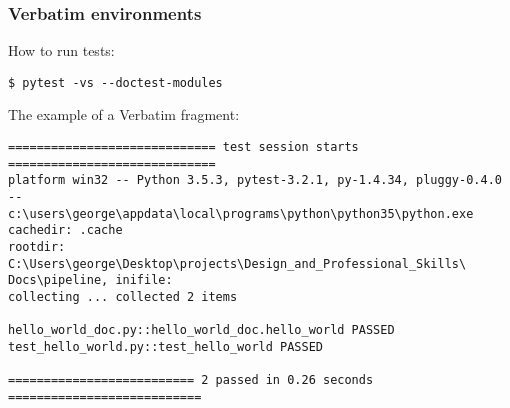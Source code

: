 \documentclass{beamer}
\begin{document}
\date{\today} 




\begin{frame}[fragile]
\frametitle{Verbatim environments} 

How to run tests:
\begin{verbatim}
$ pytest -vs --doctest-modules
\end{verbatim}

\vspace{5mm}

The example of a Verbatim fragment:
\scriptsize %
\begin{verbatim}
============================= test session starts =============================
platform win32 -- Python 3.5.3, pytest-3.2.1, py-1.4.34, pluggy-0.4.0 -- 
c:\users\george\appdata\local\programs\python\python35\python.exe
cachedir: .cache
rootdir: C:\Users\george\Desktop\projects\Design_and_Professional_Skills\
Docs\pipeline, inifile:
collecting ... collected 2 items

hello_world_doc.py::hello_world_doc.hello_world PASSED
test_hello_world.py::test_hello_world PASSED

========================== 2 passed in 0.26 seconds ===========================
\end{verbatim}

\end{frame}
\end{document}
